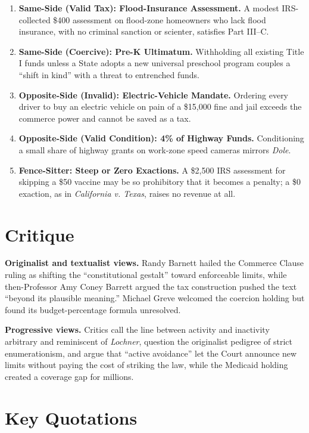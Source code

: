 \documentclass[12pt]{article}
\begin{document}
\begin{enumerate}
\item \textbf{Same-Side (Valid Tax): Flood-Insurance Assessment.} A modest IRS-collected \$400 assessment on flood-zone homeowners who lack flood insurance, with no criminal sanction or scienter, satisfies Part III--C.
\item \textbf{Same-Side (Coercive): Pre-K Ultimatum.} Withholding all existing Title I funds unless a State adopts a new universal preschool program couples a ``shift in kind'' with a threat to entrenched funds.
\item \textbf{Opposite-Side (Invalid): Electric-Vehicle Mandate.} Ordering every driver to buy an electric vehicle on pain of a \$15,000 fine and jail exceeds the commerce power and cannot be saved as a tax.
\item \textbf{Opposite-Side (Valid Condition): 4\% of Highway Funds.} Conditioning a small share of highway grants on work-zone speed cameras mirrors \textit{Dole}.
\item \textbf{Fence-Sitter: Steep or Zero Exactions.} A \$2,500 IRS assessment for skipping a \$50 vaccine may be so prohibitory that it becomes a penalty; a \$0 exaction, as in \textit{California v. Texas}, raises no revenue at all.
\end{enumerate}

\section{Critique}

\textbf{Originalist and textualist views.} Randy Barnett hailed the Commerce Clause ruling as shifting the ``constitutional gestalt'' toward enforceable limits, while then-Professor Amy Coney Barrett argued the tax construction pushed the text ``beyond its plausible meaning.'' Michael Greve welcomed the coercion holding but found its budget-percentage formula unresolved.

\textbf{Progressive views.} Critics call the line between activity and inactivity arbitrary and reminiscent of \textit{Lochner}, question the originalist pedigree of strict enumerationism, and argue that ``active avoidance'' let the Court announce new limits without paying the cost of striking the law, while the Medicaid holding created a coverage gap for millions.

\section{Key Quotations}
\end{document}
